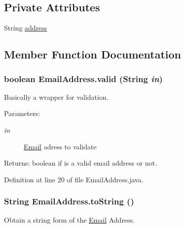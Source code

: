 \subsection*{Private Attributes}
\begin{CompactItemize}
\item 
String \hyperlink{classEmailAddress_7522c4b13c3bb74397f9b5722dc09fe8}{address}
\end{CompactItemize}


\subsection{Member Function Documentation}
\hypertarget{classEmailAddress_978fb2eb409f4b5e85c8865302f791c8}{
\subsubsection{\setlength{\rightskip}{0pt plus 5cm}boolean EmailAddress.valid (String {\em in})}}
\label{classEmailAddress_978fb2eb409f4b5e85c8865302f791c8}


Basically a wrapper for validation. 

\begin{Desc}
\item[Parameters:]
\begin{description}
\item[{\em in}]\hyperlink{classEmail}{Email} adress to validate \end{description}
\end{Desc}
\begin{Desc}
\item[Returns:]boolean if is a valid email address or not. \end{Desc}


Definition at line 20 of file EmailAddress.java.\hypertarget{classEmailAddress_3b6332aa12291f135762d3008a86151a}{
\subsubsection{\setlength{\rightskip}{0pt plus 5cm}String EmailAddress.toString ()}}
\label{classEmailAddress_3b6332aa12291f135762d3008a86151a}


Obtain a string form of the \hyperlink{classEmail}{Email} Address. 

